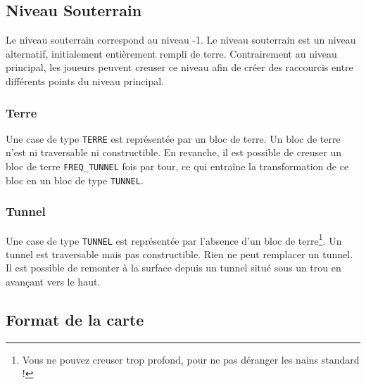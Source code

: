 \subsection{Niveau Souterrain}

Le niveau souterrain correspond au niveau -1.
Le niveau souterrain est un niveau alternatif, initialement entièrement rempli de terre.
Contrairement au niveau principal, les joueurs peuvent \og creuser\fg{} ce niveau afin
de créer des raccourcis entre différents points du niveau principal.

\subsubsection{Terre}

Une case de type \texttt{TERRE} est représentée par un bloc de terre.
%
Un bloc de terre n'est ni traversable ni constructible.
En revanche, il est possible de creuser un bloc de terre \texttt{FREQ\_TUNNEL} fois
par tour, ce qui entraîne la transformation de ce bloc en un bloc de type
\texttt{TUNNEL}.
%

\subsubsection{Tunnel}

Une case de type \texttt{TUNNEL} est représentée par l'absence d'un bloc de terre\footnote{Vous ne pouvez creuser trop profond, pour ne pas déranger les nains standard !}.
%
Un tunnel est traversable mais pas constructible. Rien ne peut remplacer un tunnel.
%
Il est possible de remonter à la surface depuis un tunnel situé sous un trou en avançant vers le haut. 

\subsection{Format de la carte}

